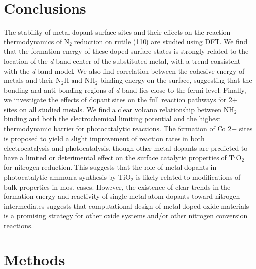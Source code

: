 \section{Conclusions}
The stability of metal dopant surface sites and their effects on the reaction thermodynamics of N$_2$ reduction on rutile (110) are studied using DFT. We find that the formation energy of these doped surface states is strongly related to the location of the \textit{d}-band center of the substituted metal, with a trend consistent with the \textit{d}-band model. We also find correlation between the cohesive energy of metals and their N$_2$H and NH$_2$ binding energy on the surface, suggesting that the bonding and anti-bonding regions of \textit{d}-band lies close to the fermi level. Finally, we investigate the effects of dopant sites on the full reaction pathways for 2+ sites on all studied metals. We find a clear volcano relationship between NH$_2$ binding and both the electrochemical limiting potential and the highest thermodynamic barrier for photocatalytic reactions. The formation of Co 2+ sites is proposed to yield a slight improvement of reaction rates in both electrocatalysis and photocatalysis, though other metal dopants are predicted to have a limited or deterimental effect on the surface catalytic properties of TiO$_2$ for nitrogen reduction. This suggests that the role of metal dopants in photocatalytic ammonia synthesis by TiO$_2$ is likely related to modifications of bulk properties in most cases. However, the existence of clear trends in the formation energy and reactivity of single metal atom dopants toward nitrogen intermediates suggests that computational design of metal-doped oxide materials is a promising strategy for other oxide systems and/or other nitrogen conversion reactions.



\section{Methods}
\label{sec:methods}

